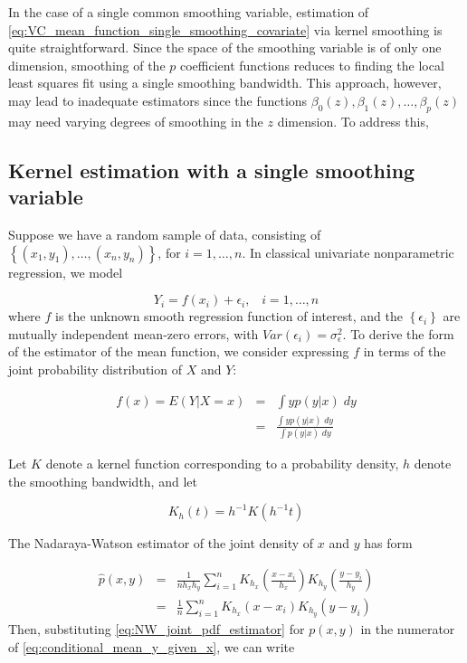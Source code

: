 \documentclass[12pt]{article}
\begin{document}
In the case of a single common smoothing variable, estimation of \ref{eq:VC_mean_function_single_smoothing_covariate} via kernel smoothing is quite straightforward. Since the space of the smoothing variable is of only one dimension, smoothing of the $p$ coefficient functions reduces to finding the local least squares fit using a single smoothing bandwidth. This approach, however, may lead to inadequate estimators since the functions $\beta_0\left(z\right), \beta_1\left(z\right), \dots, \beta_p\left(z\right)$ may need varying degrees of smoothing in the $z$ dimension. To address this, 

\subsection{Kernel estimation with a single smoothing variable}

Suppose we have a random sample of data, consisting of $\left\{ \left(x_1, y_1\right),\dots, \left(x_n, y_n\right)\right\}$, for $i=1,\dots,n$. In classical univariate nonparametric regression, we model 

\begin{equation}
Y_i = f\left(x_i\right) + \epsilon_i,\;\;\;i=1,\dots, n \label{eq:classical_NP_regression_model}
\end{equation} 
\noindent
where $f$ is the unknown smooth regression function of interest, and the $\left\{ \epsilon_i \right\}$ are mutually independent mean-zero errors, with $Var\left(\epsilon_i\right)=\sigma_\epsilon^2$. To derive the form of the estimator of the mean function, we consider expressing $f$ in terms of the joint probability distribution of $X$ and $Y$:

\begin{eqnarray} 
f\left(x\right) = E\left(Y \vert X=x\right) &=& \int yp(y \vert x)\;dy \nonumber \\
&=& \frac{ \int yp(y \vert x)\;dy }{ \int p(y \vert x)\;dy } \label{eq:conditional_mean_y_given_x}
\end{eqnarray}
 
Let $K$ denote a kernel function corresponding to a probability density, $h$ denote the smoothing bandwidth, and let 

\[
K_h\left(t\right) = h^{-1} K\left(h^{-1} t \right)
\] 

The Nadaraya-Watson estimator of the joint density of $x$ and $y$ has form

\begin{eqnarray} 
\hat{p}\left(x,y\right) &=& \frac{1}{nh_x h_y}\sum_{i=1}^{n} K_{h_x}\left(\frac{x-x_i}{h_x}\right) K_{h_y}\left(\frac{y-y_i}{h_y}\right)  \nonumber \\ 
&=& \frac{1}{n}\sum_{i=1}^{n} K_{h_x}\left(x-x_i\right) K_{h_y}\left(y-y_i\right) \label{eq:NW_joint_pdf_estimator} 
\end{eqnarray}
\noindent
Then, substituting \ref{eq:NW_joint_pdf_estimator} for $p\left(x,y\right)$ in the numerator of \ref{eq:conditional_mean_y_given_x}, we can write 
\end{document}
